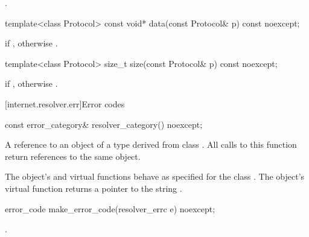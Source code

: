 \begin{itemdescr}
\pnum
\returns {}.
\end{itemdescr}

\begin{itemdecl}
template<class Protocol> const void* data(const Protocol& p) const noexcept;
\end{itemdecl}

\begin{itemdescr}
\pnum
\returns {} if , otherwise .
\end{itemdescr}

\begin{itemdecl}
template<class Protocol> size_t size(const Protocol& p) const noexcept;
\end{itemdecl}

\begin{itemdescr}
\pnum
\returns {} if , otherwise .
\end{itemdescr}




%
[internet.resolver.err]{Error codes}

%
\begin{itemdecl}
const error_category& resolver_category() noexcept;
\end{itemdecl}

\begin{itemdescr}
\pnum
\returns A reference to an object of a type derived from class . All calls to this function return references to the same object.

\pnum
The object's  and  virtual functions behave as specified for the class . The object's  virtual function returns a pointer to the string .
\end{itemdescr}

%
%
\begin{itemdecl}
error_code make_error_code(resolver_errc e) noexcept;
\end{itemdecl}

\begin{itemdescr}
\pnum
\returns {}.
\end{itemdescr}

